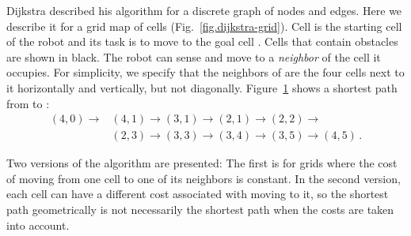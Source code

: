 Dijkstra described his algorithm for a discrete graph of nodes and edges. Here we describe it for a grid map of cells (Fig.~\ref{fig.dijkstra-grid}). Cell  is the starting cell of the robot and its task is to move to the goal cell . Cells that contain obstacles are shown in black. The robot can sense and move to a \emph{neighbor} of the cell  it occupies. For simplicity, we specify that the neighbors of  are the four cells next to it horizontally and vertically, but not diagonally. Figure~\ref{fig.dijkstra-path} shows a shortest path from  to :
\[
\begin{array}{ll}
(4,0) \rightarrow &(4,1)\rightarrow (3,1) \rightarrow (2,1) \rightarrow (2,2) \rightarrow \\
&(2,3) \rightarrow (3,3) \rightarrow (3,4) \rightarrow (3,5) \rightarrow (4,5)\,.
\end{array}
\]

\begin{figure}
\subfigures
\begin{minipage}{\textwidth}
\hspace{\fill}
\label{fig.dijkstra-grid}\label{fig.dijkstra-path}
\end{minipage}
\end{figure}

Two versions of the algorithm are presented: The first is for grids where the cost of moving from one cell to one of its neighbors is constant. In the second version, each cell can have a different cost associated with moving to it, so the shortest path geometrically is not necessarily the shortest path when the costs are taken into account.

